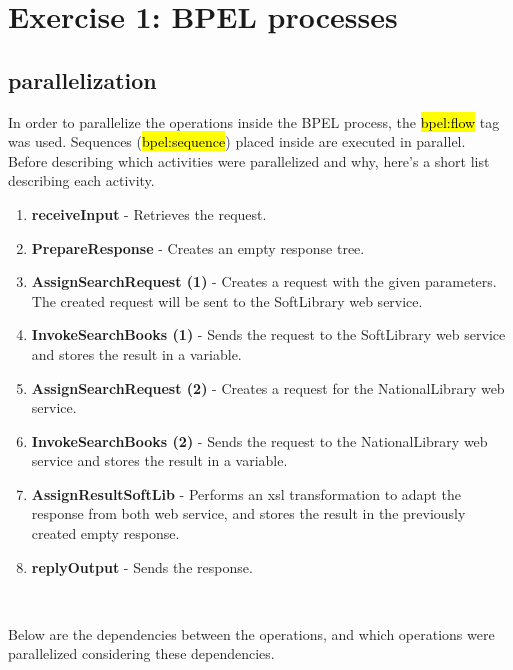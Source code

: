 \section{Exercise 1: BPEL processes}

\subsection{parallelization}

In order to parallelize the operations inside the BPEL process, the
\hl{bpel:flow} tag was used. Sequences (\hl{bpel:sequence}) placed inside are
executed in parallel.\\

Before describing which activities were parallelized and why, here's a short
list describing each activity.

\begin{enumerate}
    \item \textbf{receiveInput} - Retrieves the request.
    \item \textbf{PrepareResponse} - Creates an empty response tree.
    \item \textbf{AssignSearchRequest (1)} - Creates a request with the given
        parameters. The created request will be sent to the SoftLibrary web
        service.
    \item \textbf{InvokeSearchBooks (1)} - Sends the request to the SoftLibrary web
        service and stores the result in a variable.
    \item \textbf{AssignSearchRequest (2)} - Creates a request for the
        NationalLibrary web service.
    \item \textbf{InvokeSearchBooks (2)} - Sends the request to the NationalLibrary
        web service and stores the result in a variable.
    \item \textbf{AssignResultSoftLib} - Performs an xsl transformation to
        adapt the response from both web service, and stores the result
        in the previously created empty response.
    \item \textbf{replyOutput} - Sends the response.
\end{enumerate}
\

Below are the dependencies between the operations, and which operations were
parallelized considering these dependencies.\\

